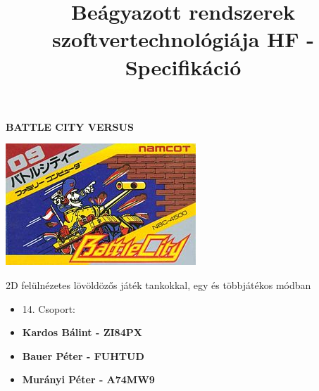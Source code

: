 \documentclass[12pt]{article}
\title{Beágyazott rendszerek szoftvertechnológiája HF - Specifikáció\vspace{-6ex}}
\date{}
\begin{document}
\maketitle

\begin{Huge}
\begin{center}
\textbf{BATTLE CITY VERSUS}
\end{center}
\end{Huge}

\centering
\includegraphics{Battle_City_NES_cover}


2D felülnézetes lövöldözős játék tankokkal, egy és többjátékos módban

\begin{itemize}
\item[] 14. Csoport:
\item[] \textbf{Kardos Bálint - ZI84PX} 
\item[] \textbf{Bauer Péter - FUHTUD}
\item[] \textbf{Murányi Péter - A74MW9}
\end{itemize}
\end{document}
